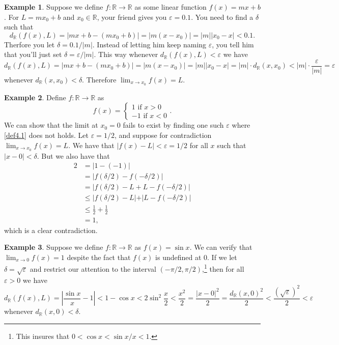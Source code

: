 \documentclass{article}
\newcommand{\R}{\mathbb{R}}
\theoremstyle{definition}
\newtheorem{example}{Example}[section]
\begin{document}
	\begin{example}
		Suppose we define $ f:\R\to\R $ as some linear function $ f(x)=mx+b $. For $ L=mx_0+b $ and $ x_0\in\R $, your friend gives you $ \varepsilon=0.1 $. You need to find a $ \delta $ such that $$d_\R(f(x),L)=|mx+b-(mx_0+b)|=|m(x-x_0)|=|m||x_0-x|<0.1.$$ Therfore you let $ \delta=0.1/|m| $. Instead of letting him keep naming $ \varepsilon $, you tell him that you'll just set $ \delta=\varepsilon/|m| $. This way whenever $ d_\R(f(x),L)<\varepsilon $ we have 
		$$ d_\R(f(x),L)=|mx+b-(mx_0+b)|=|m(x-x_0)|=|m||x_0-x|=|m|\cdot d_\R(x,x_0)<|m|\cdot\frac{\varepsilon}{|m|}=\varepsilon $$ whenever $ d_\R(x,x_0)<\delta $. Therefore $ \lim_{x\to x_0}f(x)=L $.  
	\end{example}
	\begin{example}
		Define $ f:\R\to\R $ as 
		$$f(x) =  \begin{cases}
			1\text{ if }x>0\\-1\text{ if }x<0
		\end{cases} .$$
		We can show that the limit at $ x_0=0 $ fails to exist by finding one such $ \varepsilon $ where \cref{def4.1} does not holds. Let $ \varepsilon=1/2 $, and suppose for contradiction $ \lim_{x\to x_0}f(x)=L $. We have that $ |f(x)-L|<\varepsilon=1/2 $ for all $ x $ such that $ |x-0|<\delta $. But we also have that 
		\begin{align*}
			2&=|1-(-1)|\\
			&=\left\lvert f(\delta/2)-f(-\delta/2) \right\rvert\\
			&=\left\lvert f(\delta/2)-L+L-f(-\delta/2) \right\rvert\\
			&\le\left\lvert f(\delta/2)-L|+|L-f(-\delta/2) \right\rvert\\
			&\le\frac{1}{2}+\frac{1}{2}\\&=1,
		\end{align*}
		which is a clear contradiction.
	\end{example}
	\begin{example}
		Suppose we define $ f:\R\to\R $ as $ f(x)=\sin x $. We can verify that $ \lim_{x\to 0}f(x)=1 $ despite the fact that $ f(x) $ is undefined at $ 0 $. If we let $ \delta=\sqrt{\varepsilon} $ and restrict our attention to the interval $ (-\pi/2,\pi/2) $,\footnote{This insures that $ 0<\cos x<\sin x/x <1 $.} then for all $ \varepsilon>0 $ we have $$d_\R(f(x),L)=\left\lvert \frac{\sin x}{x}-1\right\rvert<1-\cos x<2\sin^2\frac{x}{2}<\frac{x^2}{2}=\frac{|x-0|^2}{2}=\frac{d_\R(x,0)^2}{2}<\frac{(\sqrt{\varepsilon})^2}{2}<\varepsilon$$ whenever $ d_\R(x,0)<\delta $. 
	\end{example}
\end{document}
